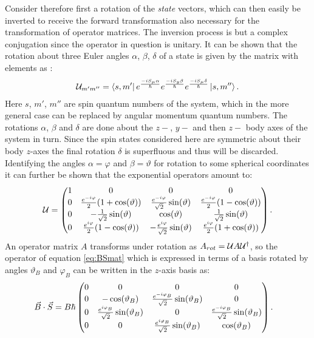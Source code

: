 \documentclass[a4paper]{article}
\begin{document}
Consider therefore first a rotation of the \textit{state} vectors, which can then easily
be inverted to receive the forward transformation also necessary for the transformation
of operator matrices. The inversion process is but a complex
conjugation since the operator in question is unitary. It can be shown 
that the rotation about three Euler angles \(\alpha\), \(\beta\), \(\delta\) of a state is
given  by the matrix with elements as \cite{sakurai}:
\begin{align*}
        \mathbb{\cal U}_{m'm''} = \bra{s,
        m'}e^{\frac{-iS_\mu\alpha}{\hbar}}e^{\frac{-iS_y\beta}{\hbar}}e^{\frac{-iS_\mu\delta}{\hbar{}}}\ket{s,
m''}
.\end{align*}
Here \(s\), \(m'\), \(m''\) are spin quantum numbers of the system, which in the more general
case can be replaced by angular momentum quantum numbers. The rotations \(\alpha\),
\(\beta\) and \(\delta\) are done about the \(z-\), \(y-\) and then \(z-\) body axes of
the system in turn. Since the spin states considered here are symmetric about their
body \(z\)-axes the final rotation \(\delta\) is superfluous and thus will be discarded.
Identifying the angles \(\alpha = \varphi\) and \(\beta = \vartheta\) for rotation to some
spherical coordinates it can further be
shown that the exponential operators amount to:
\begin{align*}
        \U = \pmqty{
        1 & 0 & 0 & 0\\
        0 & \frac{e^{-i\varphi}}{2}(1+\cos(\vartheta)) &
        \frac{e^{-i\varphi}}{\sqrt{2}}\sin(\vartheta) &
        \frac{e^{-i\varphi}}{2}(1-\cos(\vartheta))\\
        0 & -\frac{1}{\sqrt{2}}\sin(\vartheta) & \cos(\vartheta) & \frac{1}{\sqrt{2} }
        \sin(\vartheta)\\
        0 & \frac{e^{i\varphi}}{2}(1-\cos(\vartheta)) &
        -\frac{e^{i\varphi}}{\sqrt{2}}\sin(\vartheta) & \frac{e^{i\varphi}}{2}(1 +
        \cos(\vartheta))
}
.\end{align*}
An operator matrix \(A\) transforms under rotation as \(A_{rot} = \mathbb{\cal U} A\mathbb{\cal U}^{\dagger}\), so
the operator of equation \ref{eq:BSmat} which is expressed in terms of a basis rotated by
angles \(\vartheta_B\) and \(\varphi_B\) can be written in the \(z\)-axis basis as:
\begin{align}\label{eq:BSrot}
    \va{B}\cdot \va{S} &= B\hbar{}\pmqty{
            0 & 0 & 0 & 0\\
            0 & -\cos(\vartheta_B) & \frac{e^{-i\varphi_B}}{\sqrt{2} }\sin(\vartheta_B) & 0\\
                    0 & \frac{e^{i\varphi_B}}{\sqrt{2} }\sin(\vartheta_B) & 0 &
                    \frac{e^{-i\varphi_B}}{\sqrt{2} }\sin(\vartheta_B)\\
                    0 & 0 & \frac{e^{i\varphi_B}}{\sqrt{2} }\sin(\vartheta_B) & \cos(\vartheta_B)
            }
.\end{align}
\end{document}
